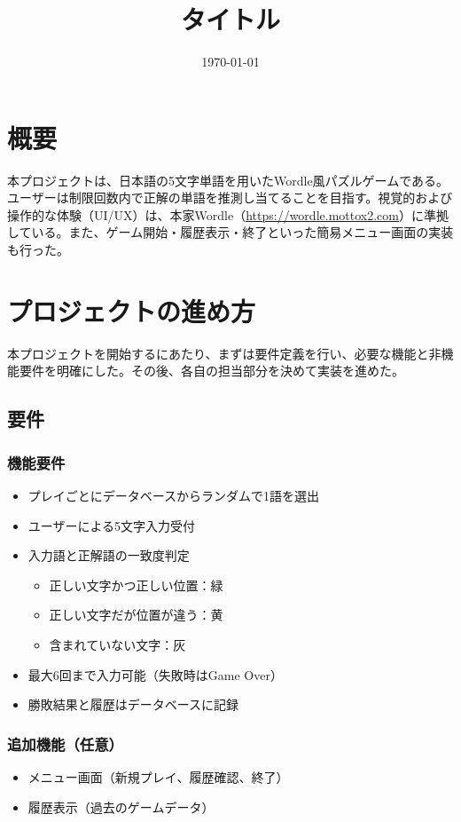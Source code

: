 \documentclass[a4j]{ujarticle}
\title{タイトル}
\date{\today}
\author{}
\begin{document}
\maketitle
\section{概要}
本プロジェクトは、日本語の5文字単語を用いたWordle風パズルゲームである。ユーザーは制限回数内で正解の単語を推測し当てることを目指す。視覚的および操作的な体験（UI/UX）は、本家Wordle（\url{https://wordle.mottox2.com}）に準拠している。また、ゲーム開始・履歴表示・終了といった簡易メニュー画面の実装も行った。
\section{プロジェクトの進め方}
本プロジェクトを開始するにあたり、まずは要件定義を行い、必要な機能と非機能要件を明確にした。その後、各自の担当部分を決めて実装を進めた。
\subsection{要件}
\subsubsection{機能要件}
\begin{itemize}
  \item プレイごとにデータベースからランダムで1語を選出
  \item ユーザーによる5文字入力受付
  \item 入力語と正解語の一致度判定
  \begin{itemize}
    \item 正しい文字かつ正しい位置：緑
    \item 正しい文字だが位置が違う：黄
    \item 含まれていない文字：灰
  \end{itemize}
  \item 最大6回まで入力可能（失敗時はGame Over）
  \item 勝敗結果と履歴はデータベースに記録
\end{itemize}

\subsubsection{追加機能（任意）}
\begin{itemize}
  \item メニュー画面（新規プレイ、履歴確認、終了）
  \item 履歴表示（過去のゲームデータ）
\end{itemize}
\end{document}

